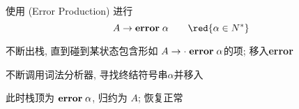 \begin{frame}{}
  \begin{center}
    使用  (Error Production) 进行
    \[
      A \to \text{\bf error}\; \alpha \qquad \red{\alpha \in N^{\ast}}
    \]


    \pause
    \vspace{0.30cm}
    \begin{description}
      \setlength{\itemsep}{8pt}
      \item[调整状态] 不断出栈, 直到碰到某状态包含形如
        $A \to \cdot\; \text{\bf error}\; \alpha$的项; 移入{\bf error}
      \item[丢弃输入] 不断调用词法分析器, 寻找终结符号串$\alpha$并移入
      \item[假装成功] 此时栈顶为 $\text{\bf error}\; \alpha$, 归约为 $A$; 恢复正常
    \end{description}
  \end{center}
\end{frame}
